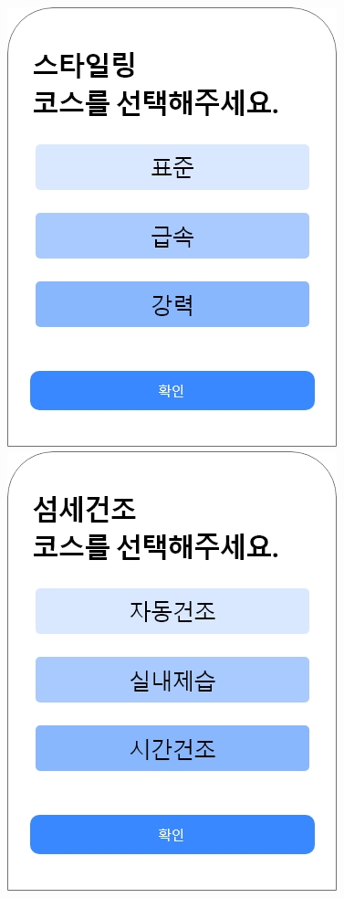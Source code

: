 \documentclass[conference]{IEEEtran}
\begin{document}
\begin{enumerate}
\centerline{\includegraphics[scale=0.3]{assets/스타일링 선택.jpg}
            \includegraphics[scale=0.3]{assets/섬세건조 선택.jpg}} \\ \\

\end{enumerate}
\end{document}
